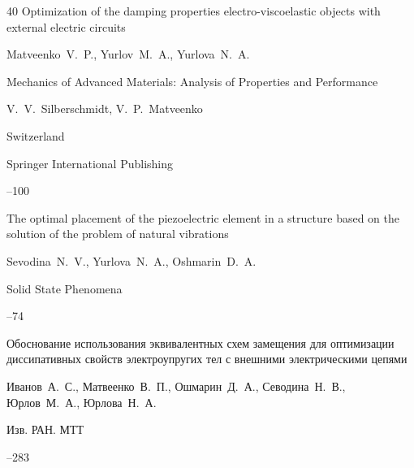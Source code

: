 \begin{thebibliography}{40}
\paper Optimization of the damping properties electro-viscoelastic objects with external electric circuits

\by Matveenko~V.~P., Yurlov~M.~A., Yurlova~N.~A.

\inbook Mechanics of Advanced Materials: Analysis of Properties and Performance

\eds V.~V.~Silberschmidt, V.~P.~Matveenko

\publaddr Switzerland

\publ Springer International Publishing


--100





\paper The optimal placement of the piezoelectric element in a structure based on the solution of the problem of natural vibrations

\by Sevodina~N.~V., Yurlova~N.~A., Oshmarin~D.~A.

\jour Solid State Phenomena



--74





\paper Обоснование использования эквивалентных схем замещения для оптимизации диссипативных свойств электроупругих тел с внешними электрическими цепями

\by Иванов~А.~С., Матвеенко~В.~П., Ошмарин~Д.~А., Севодина~Н.~В., Юрлов~М.~А., Юрлова~Н.~А.

\jour Изв. РАН. МТТ



--283




\end{thebibliography}

\RuDate





\renewcommand{\baselinestretch}{0.88}



\newpage



